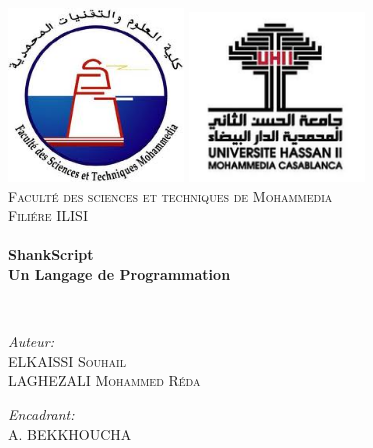 \begin{titlepage}
\begin{center}

\includegraphics[width=0.35\textwidth]{./LogoFSTM.jpg}
\includegraphics[width=0.35\textwidth]{./univlogo.png}
\\[1cm]

\textsc{\LARGE Faculté des sciences et techniques de Mohammedia}\\[1.5cm]

\textsc{\Large Filiére ILISI }\\[0.5cm]

\HRule \\[0.4cm]

{\huge \bfseries ShankScript\\
Un Langage de Programmation \\[0.4cm] }

\HRule \\[1.5cm]

\begin{minipage}{0.4\textwidth}
\begin{flushleft} \large
\emph{Auteur:}\\
ELKAISSI \textsc{Souhail}\\
LAGHEZALI \textsc{Mohammed Réda}\\

\end{flushleft}
\end{minipage}
\begin{minipage}{0.4\textwidth}
\begin{flushright} \large
\emph{Encadrant:} \\
A. \textsc{ BEKKHOUCHA}\\


\end{flushright}
\end{minipage}
\end{center}
\end{titlepage}
